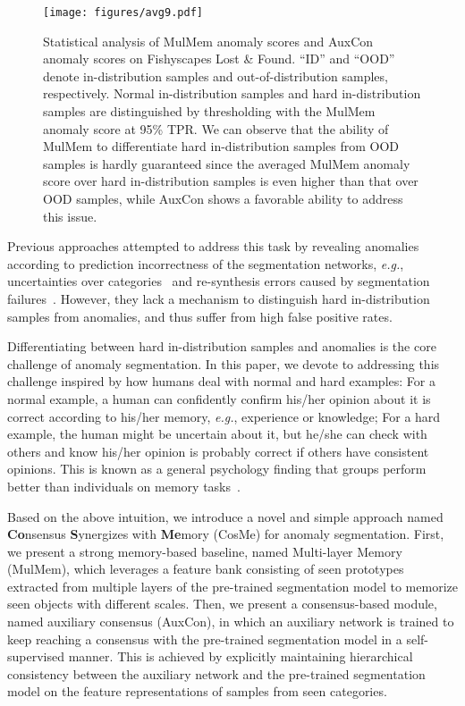 \documentclass[10pt,twocolumn,letterpaper]{article}
\begin{document}
\begin{figure}[t]
  \centering
\texttt{[image: figures/avg9.pdf]}
   \caption{Statistical analysis of MulMem anomaly scores and AuxCon anomaly scores on Fishyscapes Lost \& Found. ``ID'' and ``OOD'' denote in-distribution samples and out-of-distribution samples, respectively. Normal in-distribution samples and hard in-distribution samples are distinguished by thresholding with the MulMem anomaly score at 95\% TPR. We can observe that the ability of MulMem to differentiate hard in-distribution samples from OOD samples is hardly guaranteed since the averaged MulMem anomaly score over hard in-distribution samples is even higher than that over OOD samples, while AuxCon shows a favorable ability to address this issue. }
   \vspace{-5mm}
   \label{fig:avg_ano}
\end{figure}

Previous approaches attempted to address this task by revealing anomalies according to prediction incorrectness of the segmentation networks, \emph{e.g.}, uncertainties over categories~\cite{MSP,SML} and re-synthesis errors caused by segmentation failures~\cite{imgr,SynthCP,noti}. However, they lack a mechanism to distinguish hard in-distribution samples from anomalies, and thus suffer from high false positive rates.




Differentiating between hard in-distribution samples and anomalies is the core challenge of anomaly segmentation. In this paper, we devote to addressing this challenge inspired by how humans deal with normal and hard examples: For a normal example, a human can confidently confirm his/her opinion about it is correct according to his/her memory, \emph{e.g.}, experience or knowledge; For a hard example, the human might be uncertain about it, but he/she can check with others and know his/her opinion is probably correct if others have consistent opinions. This is known as a general psychology finding that groups perform better than individuals on memory tasks~\cite{cac}.









Based on the above intuition, we introduce a novel and simple approach named \textbf{Co}nsensus \textbf{S}ynergizes with \textbf{Me}mory (CosMe) for anomaly segmentation. First, we present a strong memory-based baseline, named Multi-layer Memory (MulMem), which leverages a feature bank consisting of seen prototypes extracted from multiple layers of the pre-trained segmentation model to memorize seen objects with different scales. Then, we present a consensus-based module, named auxiliary consensus (AuxCon), in which an auxiliary network is trained to keep reaching a consensus with the pre-trained segmentation model in a self-supervised manner. This is achieved by explicitly maintaining hierarchical consistency between the auxiliary network and the pre-trained segmentation model on the feature representations of samples from seen categories.
\end{document}
